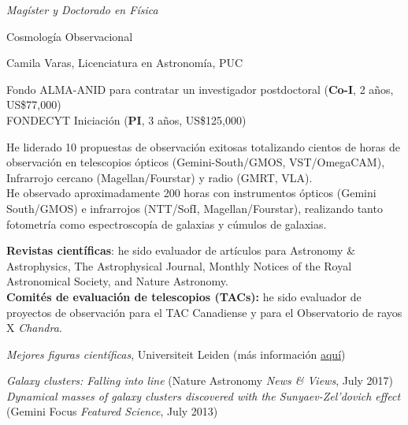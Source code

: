 \documentclass[11pt]{article}
\begin{document}
\noindent
\emph{Magíster y Doctorado en Física}

 Cosmología Observacional


 Camila Varas, Licenciatura en Astronomía, PUC\\



\noindent
{} Fondo ALMA-ANID para contratar un investigador postdoctoral (\textbf{Co-I}, 2 años, US\$77,000)\\
 FONDECYT Iniciaci\'on (\textbf{PI}, 3 años, US\$125,000)



\noindent
He liderado 10 propuestas de observación exitosas totalizando cientos de horas 
de observación en telescopios ópticos (Gemini-South/GMOS, VST/OmegaCAM), 
Infrarrojo cercano (Magellan/Fourstar) y radio (GMRT, VLA).\\

{He observado aproximadamente 200 horas con instrumentos ópticos (Gemini 
South/GMOS) e infrarrojos (NTT/SofI, Magellan/Fourstar), realizando tanto 
fotometría como espectroscopía de galaxias y cúmulos de galaxias.}


%



\noindent\textbf{Revistas científicas}: he sido evaluador de artículos para Astronomy 
    \& Astrophysics, The Astrophysical Journal, Monthly Notices of the Royal 
    Astronomical Society, and Nature Astronomy.\\
\noindent\textbf{Comités de evaluación de telescopios (TACs):} he sido evaluador de 
    proyectos de observación para el TAC Canadiense y para el Observatorio de rayos 
    X \textit{Chandra}.


\noindent
{} \emph{Mejores figuras científicas}, Universiteit Leiden
(más información \href{https://home.strw.leidenuniv.nl/~kenworthy/teaching/better_figures/}{aquí})


\noindent
\emph{Galaxy clusters: Falling into line} (Nature Astronomy \emph{News \& 
Views}, July 2017)\\
\emph{Dynamical masses of galaxy clusters discovered with the Sunyaev-Zel'dovich 
effect} (Gemini Focus \emph{Featured Science}, July 2013)
\end{document}
